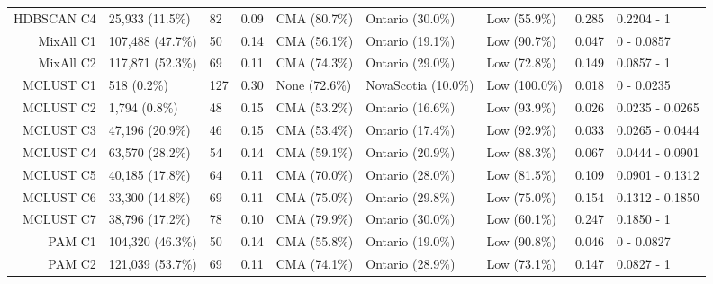 \documentclass[11pt, a4paper]{article}
\begin{document}
\begin{table}[H]
{\begin{tabular}{|r|llllllll|}
\rowcolor{gray!25}  HDBSCAN C4 & 25,933 (11.5\%) & 82 & 0.09 & CMA (80.7\%) & Ontario (30.0\%) & Low (55.9\%) & 0.285 & 0.2204 - 1 \\
  MixAll C1 & 107,488 (47.7\%) & 50 & 0.14 & CMA (56.1\%) & Ontario (19.1\%) & Low (90.7\%) & 0.047 & 0 - 0.0857 \\
  MixAll C2 & 117,871 (52.3\%) & 69 & 0.11 & CMA (74.3\%) & Ontario (29.0\%) & Low (72.8\%) & 0.149 & 0.0857 - 1 \\
 \rowcolor{gray!25} MCLUST C1 & 518 (0.2\%) & 127 & 0.30 & None (72.6\%) & NovaScotia (10.0\%) & Low (100.0\%) & 0.018 & 0 - 0.0235 \\
\rowcolor{gray!25}  MCLUST C2 & 1,794 (0.8\%) & 48 & 0.15 & CMA (53.2\%) & Ontario (16.6\%) & Low (93.9\%) & 0.026 & 0.0235 - 0.0265 \\
\rowcolor{gray!25}  MCLUST C3 & 47,196 (20.9\%) & 46 & 0.15 & CMA (53.4\%) & Ontario (17.4\%) & Low (92.9\%) & 0.033 & 0.0265 - 0.0444 \\
\rowcolor{gray!25}  MCLUST C4 & 63,570 (28.2\%) & 54 & 0.14 & CMA (59.1\%) & Ontario (20.9\%) & Low (88.3\%) & 0.067 & 0.0444 - 0.0901 \\
\rowcolor{gray!25}  MCLUST C5 & 40,185 (17.8\%) & 64 & 0.11 & CMA (70.0\%) & Ontario (28.0\%) & Low (81.5\%) & 0.109 & 0.0901 - 0.1312 \\
 \rowcolor{gray!25} MCLUST C6 & 33,300 (14.8\%) & 69 & 0.11 & CMA (75.0\%) & Ontario (29.8\%) & Low (75.0\%) & 0.154 & 0.1312 - 0.1850 \\
\rowcolor{gray!25}  MCLUST C7 & 38,796 (17.2\%) & 78 & 0.10 & CMA (79.9\%) & Ontario (30.0\%) & Low (60.1\%) & 0.247 & 0.1850 - 1 \\
  PAM C1 & 104,320 (46.3\%) & 50 & 0.14 & CMA (55.8\%) & Ontario (19.0\%) & Low (90.8\%) & 0.046 & 0 - 0.0827 \\
  PAM C2 & 121,039 (53.7\%) & 69 & 0.11 & CMA (74.1\%) & Ontario (28.9\%) & Low (73.1\%) & 0.147 & 0.0827 - 1 \\
   \hline
\end{tabular}}
\end{table}
\end{document}
